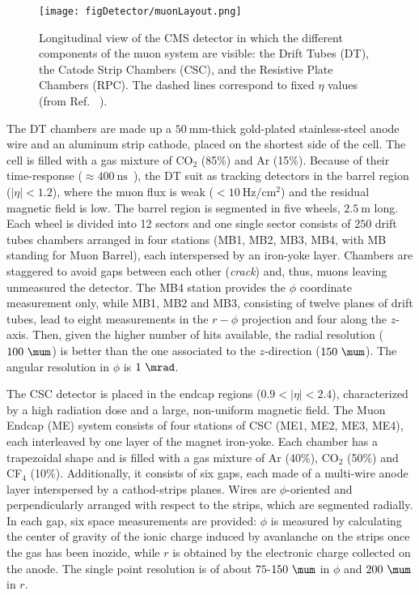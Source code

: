 \begin{figure}[hbt]
  \begin{center}
    \texttt{[image: figDetector/muonLayout.png]}
    \caption{Longitudinal view of the CMS detector in which the different components of the muon system are visible:
             the Drift Tubes (DT), the Catode Strip Chambers (CSC), and the Resistive Plate Chambers (RPC).
             The dashed lines correspond to fixed $\eta$ values (from Ref. ~\cite{Chatrchyan:2013sba}).} 
    \label{fig:muLayout}
  \end{center}
\end{figure}

The DT chambers are made up a $50~\si{\mm}$-thick gold-plated stainless-steel anode wire and an aluminum strip cathode, 
placed on the shortest side of the cell. The cell is filled with a gas mixture of CO$_2$ (85\%) and Ar (15\%). 
Because of their time-response ($\approx400~\si{\ns}$~\cite{Chatrchyan:2013sba}), the DT suit as tracking detectors 
in the barrel region ($|\eta|<1.2$), where the muon flux is weak ($<10~\si{\hertz}/\si{\cm}^2$) and the residual magnetic field is low.  
The barrel region is segmented in five wheels, $2.5~\si{\m}$ long. Each wheel is divided into 12 sectors and 
one single sector consists of $250$ drift tubes chambers arranged in four stations (MB1, MB2, MB3, MB4, with MB standing for
Muon Barrel), each interspersed by an iron-yoke layer. Chambers are staggered to avoid gaps between each other (\emph{crack}) and, thus, muons leaving unmeasured 
the detector. The MB4 station provides the $\phi$ coordinate measurement only, while MB1, MB2 and MB3, consisting of twelve 
planes of drift tubes, lead to eight measurements in the $r-\phi$ projection and four along the $z$-axis.
Then, given the higher number of hits available, the radial resolution ($100~\si{\mum}$) is better than the one
associated to the $z$-direction ($150~\si{\mum}$). The angular resolution in $\phi$ is $1~\si{\mrad}$.

The CSC detector is placed in the endcap regions ($0.9<|\eta|<2.4$), characterized by a high radiation dose
and a large, non-uniform magnetic field. The Muon Endcap (ME) system consists of four stations of CSC (ME1, ME2, ME3, ME4), each
interleaved by one layer of the magnet iron-yoke. Each chamber has a trapezoidal shape and is filled with 
a gas mixture of Ar (40\%), CO$_2$ (50\%) and CF$_4$ (10\%). Additionally, it consists of six gaps, each
made of a multi-wire anode layer interspersed by a cathod-strips planes. Wires are $\phi$-oriented and 
perpendicularly arranged with respect to the strips, which are segmented radially. 
In each gap, six space measurements are provided: $\phi$ is measured by calculating the center of gravity 
of the ionic charge induced by avanlanche on the strips once the gas has been inozide, while 
$r$ is obtained by the electronic charge collected on the anode. The single point resolution 
is of about $75$-$150~\si{\mum}$ in $\phi$ and $200~\si{\mum}$ in $r$.

